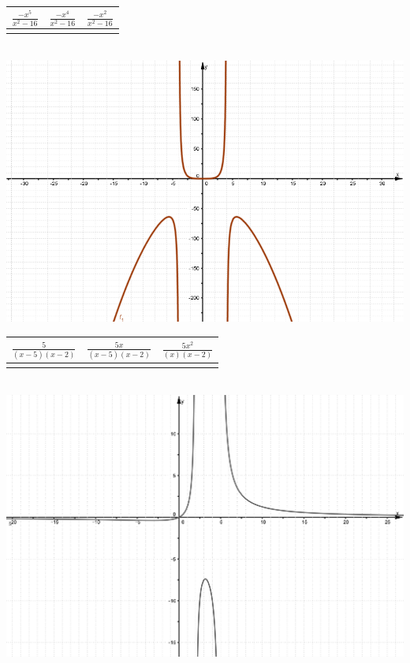 \documentclass[a4paper,spanish]{exam}
\newcommand{\Ts}{\rule{0pt}{2.8ex}}       %
\newcommand{\Bs}{\rule[-1.5ex]{0pt}{0pt}} %
\begin{document}
\begin{enumerate}
		\begin{minipage}{0.5\textwidth}
			\centering
			\label{mc1}
			\begin{tabular}{|c|c|c|}
				\hline
				$\frac{-x^5}{ x^2-16}$  & $\frac{-x^4}{ x^2-16}$ & $\frac{-x^2}{ x^2-16}$ \Ts \Bs   \\ \hline
				&   &      \\ \hline
			\end{tabular}\\
			\centering
			\includegraphics[width= 0.95\linewidth]{problematemarec21.png}
		\end{minipage}
		\begin{minipage}{.5\textwidth}
			\centering
			\begin{tabular}{|c|c|c|}
				\hline
				$\frac{5}{(x-5)(x-2)}$  & $\frac{5x}{(x-5)(x-2)}$ & $\frac{5x^2}{(x)(x-2)}$ \Ts \Bs   \\ \hline
				&   &      \\ \hline
			\end{tabular}\\
			\centering
			\includegraphics[width= 0.95\linewidth]{problematemarec22.png}

\end{minipage}
\end{enumerate}
\end{document}
